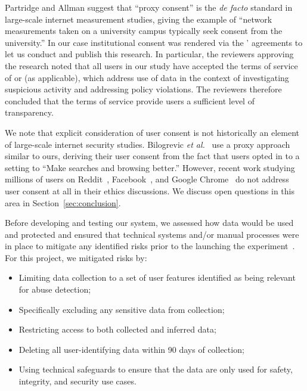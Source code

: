 Partridge and Allman suggest that ``proxy consent'' is the \emph{de facto} standard in large-scale internet measurement studies, giving the example of ``network measurements taken on a university campus typically seek consent from the university.'' In our case institutional consent was rendered via the \osns' agreements to let us conduct and publish this research. In particular, the reviewers approving the research noted that all users in our study have accepted the terms of service of \ig or \fb (as applicable), which address use of data in the context of investigating suspicious activity and addressing policy violations.
The reviewers therefore concluded that the \osn terms of service provide users a sufficient level of transparency.

We note that explicit consideration of user consent is not historically an element of large-scale internet security studies. Bilogrevic \emph{et al.}~\cite{bilogrevic-google} use a proxy approach similar to ours, deriving their user consent from the fact that users opted in to a setting to ``Make searches and browsing better.'' However, recent work studying millions of users on Reddit~\cite{kumar-reddit}, Facebook~\cite{golla-facebook,onaolapo-facebook}, and Google Chrome~\cite{thomas-stuffing} do not address user consent at all in their ethics discussions. We discuss open questions in this area in Section~\ref{sec:conclusion}.


Before developing and testing our system,
we assessed how data would be used and protected and ensured that technical systems and/or manual processes were in place to mitigate any identified risks prior to the launching the experiment\ifanon\else~\cite{meta-privacy-review}\fi. For this project, we mitigated risks by:
\begin{itemize}
    \squeezelist
    \item Limiting data collection to a set of user features identified as being relevant for abuse detection;
    \item Specifically excluding any sensitive data from collection;
    \item Restricting access to both collected and inferred data;
    \item Deleting all user-identifying data within 90 days of collection;
    \item Using technical safeguards to ensure that the data are only used for safety, integrity, and security use cases.
\end{itemize}

